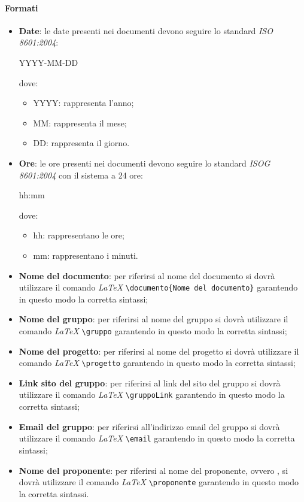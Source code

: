 \paragraph{Formati}
\begin{itemize}
   \item \textbf{Date}: le date presenti nei documenti devono seguire lo standard \textit{ISO 8601:2004}:
   \begin{center}
     YYYY-MM-DD
   \end{center}
   dove:
   \begin{itemize}
     \item YYYY: rappresenta l'anno;
     \item MM: rappresenta il mese;
     \item DD: rappresenta il giorno.
   \end{itemize}
   \item \textbf{Ore}: le ore presenti nei documenti devono seguire lo standard \textit{ISOG 8601:2004}
   con il sistema a 24 ore:
   \begin{center}
     hh:mm
   \end{center}
   dove:
   \begin{itemize}
     \item hh: rappresentano le ore;
     \item mm: rappresentano i minuti.
   \end{itemize}
   \item \textbf{Nome del documento}: per riferirsi al nome del documento si
   dovrà utilizzare il comando \textit{\LaTeX{}}   \verb|\documento{Nome del documento}|
   garantendo in questo modo la corretta sintassi;
   \item \textbf{Nome del gruppo}: per riferirsi al nome del gruppo si dovrà
   utilizzare il comando \textit{\LaTeX{}} \verb|\gruppo| garantendo in questo modo la corretta sintassi;
   \item \textbf{Nome del progetto}: per riferirsi al nome del progetto si dovrà
   utilizzare il comando \textit{\LaTeX{}} \verb|\progetto| garantendo in questo modo la corretta sintassi;
   \item \textbf{Link sito del gruppo}: per riferirsi al link del sito del gruppo si dovrà
   utilizzare il comando \textit{\LaTeX{}} \verb|\gruppoLink| garantendo in questo modo la corretta sintassi;
   \item \textbf{Email del gruppo}: per riferirsi all'indirizzo email del gruppo si dovrà
   utilizzare il comando \textit{\LaTeX{}} \verb|\email| garantendo in questo modo la corretta sintassi;
   \item \textbf{Nome del proponente}: per riferirsi al nome del proponente, ovvero \proponente, si dovrà
   utilizzare il comando \textit{\LaTeX{}}  \verb|\proponente| garantendo in questo modo la corretta
   sintassi.
      \end{itemize}


